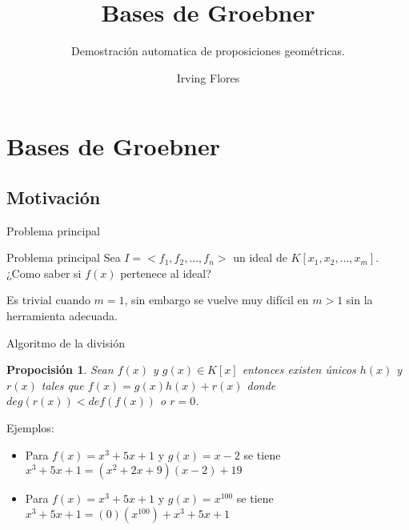 \documentclass{beamer}
\author{Irving Flores}
\institute{ESFM del IPN}
\title{Bases de Groebner}
\subtitle{Demostración automatica de proposiciones geométricas.}
\newtheorem{prop}{Propocisión}
\begin{document}
\begin{frame}
\titlepage
\end{frame}

\begin{frame}
\tableofcontents
\end{frame}

\section{Bases de Groebner}

\subsection{Motivación}

\begin{frame}{Problema principal}

	\begin{block}{Problema principal}
		Sea $I = <f_1,f_2,\ldots, f_n>$ un ideal de $K[x_1,x_2,\ldots, x_m]$.
		¿Como saber si $f(x)$ pertenece al ideal?
	\end{block}

	\pause
	Es trivial cuando $m=1$, sin embargo se vuelve muy difícil en $m>1$ sin la herramienta adecuada.
\end{frame}


\begin{frame}{Algoritmo de la división}

	\begin{prop}
		Sean $f(x)$ y $g(x)\in K[x]$ entonces existen únicos $h(x)$ y $r(x)$ tales que $f(x) = g(x)h(x)+r(x)$ donde $deg(r(x)) < def(f(x))$ o $r = 0$.
	\end{prop}

	\pause
	Ejemplos:

	\begin{itemize}
		\item Para $f(x)=x^3+5x+1$ y $g(x)=x-2$ se tiene $x^3+5x+1 = (x^2+2x+9)(x-2) + 19$
		\item Para $f(x)=x^3+5x+1$ y $g(x)=x^100$ se tiene $x^3+5x+1 = (0)(x^100) + x^3+5x+1$
	\end{itemize}

\end{frame}
\end{document}
